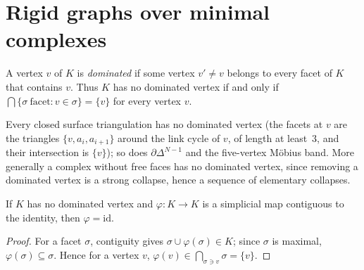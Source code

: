 
\section{Rigid graphs over minimal complexes}

\begin{definition}
A vertex $v$ of $K$ is \emph{dominated} if some vertex $v'\ne v$ belongs to every facet of $K$ that contains
$v$.  Thus $K$ has no dominated vertex if and only if $\bigcap\{\sigma\ \text{facet}: v\in\sigma\}=\{v\}$ for
every vertex $v$.
\end{definition}

Every closed surface triangulation has no dominated vertex (the facets at $v$ are the triangles $\{v,a_i,a_{i+1}\}$
around the link cycle of $v$, of length at least~$3$, and their intersection is $\{v\}$); so does
$\partial\Delta^{N-1}$ and the five-vertex M\"obius band.  More generally a complex without free faces has no
dominated vertex, since removing a dominated vertex is a strong collapse, hence a sequence of elementary collapses.

\begin{lemma}\label{lem:idalone}
If $K$ has no dominated vertex and $\varphi:K\to K$ is a simplicial map contiguous to the identity, then
$\varphi=\mathrm{id}$.
\end{lemma}
\begin{proof}
For a facet $\sigma$, contiguity gives $\sigma\cup\varphi(\sigma)\in K$; since $\sigma$ is maximal,
$\varphi(\sigma)\subseteq\sigma$.  Hence for a vertex $v$,
$\varphi(v)\in\bigcap_{\sigma\ni v}\sigma=\{v\}$.
\end{proof}

